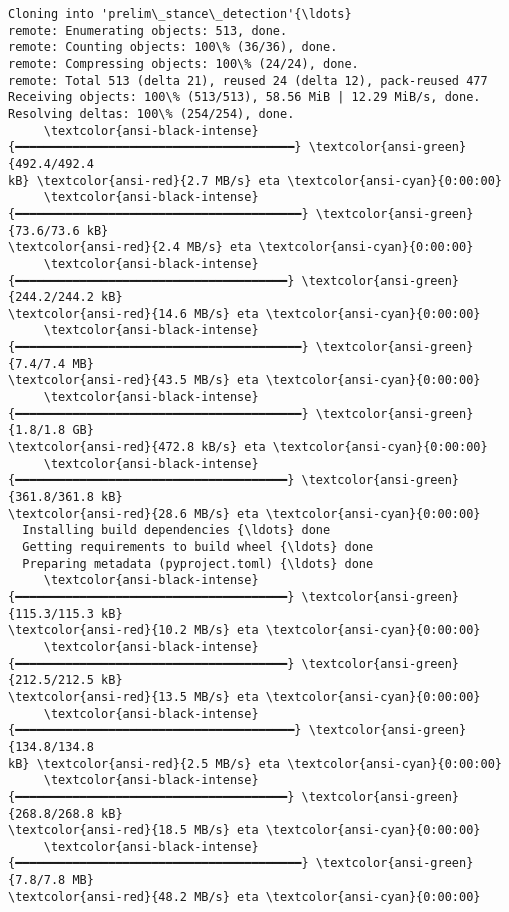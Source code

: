 \documentclass[11pt]{article}
\begin{document}
    \begin{Verbatim}[commandchars=\\\{\}]
Cloning into 'prelim\_stance\_detection'{\ldots}
remote: Enumerating objects: 513, done.
remote: Counting objects: 100\% (36/36), done.
remote: Compressing objects: 100\% (24/24), done.
remote: Total 513 (delta 21), reused 24 (delta 12), pack-reused 477
Receiving objects: 100\% (513/513), 58.56 MiB | 12.29 MiB/s, done.
Resolving deltas: 100\% (254/254), done.
     \textcolor{ansi-black-intense}{━━━━━━━━━━━━━━━━━━━━━━━━━━━━━━━━━━━━━━━} \textcolor{ansi-green}{492.4/492.4
kB} \textcolor{ansi-red}{2.7 MB/s} eta \textcolor{ansi-cyan}{0:00:00}
     \textcolor{ansi-black-intense}{━━━━━━━━━━━━━━━━━━━━━━━━━━━━━━━━━━━━━━━━} \textcolor{ansi-green}{73.6/73.6 kB}
\textcolor{ansi-red}{2.4 MB/s} eta \textcolor{ansi-cyan}{0:00:00}
     \textcolor{ansi-black-intense}{━━━━━━━━━━━━━━━━━━━━━━━━━━━━━━━━━━━━━━} \textcolor{ansi-green}{244.2/244.2 kB}
\textcolor{ansi-red}{14.6 MB/s} eta \textcolor{ansi-cyan}{0:00:00}
     \textcolor{ansi-black-intense}{━━━━━━━━━━━━━━━━━━━━━━━━━━━━━━━━━━━━━━━━} \textcolor{ansi-green}{7.4/7.4 MB}
\textcolor{ansi-red}{43.5 MB/s} eta \textcolor{ansi-cyan}{0:00:00}
     \textcolor{ansi-black-intense}{━━━━━━━━━━━━━━━━━━━━━━━━━━━━━━━━━━━━━━━━} \textcolor{ansi-green}{1.8/1.8 GB}
\textcolor{ansi-red}{472.8 kB/s} eta \textcolor{ansi-cyan}{0:00:00}
     \textcolor{ansi-black-intense}{━━━━━━━━━━━━━━━━━━━━━━━━━━━━━━━━━━━━━━} \textcolor{ansi-green}{361.8/361.8 kB}
\textcolor{ansi-red}{28.6 MB/s} eta \textcolor{ansi-cyan}{0:00:00}
  Installing build dependencies {\ldots} done
  Getting requirements to build wheel {\ldots} done
  Preparing metadata (pyproject.toml) {\ldots} done
     \textcolor{ansi-black-intense}{━━━━━━━━━━━━━━━━━━━━━━━━━━━━━━━━━━━━━━} \textcolor{ansi-green}{115.3/115.3 kB}
\textcolor{ansi-red}{10.2 MB/s} eta \textcolor{ansi-cyan}{0:00:00}
     \textcolor{ansi-black-intense}{━━━━━━━━━━━━━━━━━━━━━━━━━━━━━━━━━━━━━━} \textcolor{ansi-green}{212.5/212.5 kB}
\textcolor{ansi-red}{13.5 MB/s} eta \textcolor{ansi-cyan}{0:00:00}
     \textcolor{ansi-black-intense}{━━━━━━━━━━━━━━━━━━━━━━━━━━━━━━━━━━━━━━━} \textcolor{ansi-green}{134.8/134.8
kB} \textcolor{ansi-red}{2.5 MB/s} eta \textcolor{ansi-cyan}{0:00:00}
     \textcolor{ansi-black-intense}{━━━━━━━━━━━━━━━━━━━━━━━━━━━━━━━━━━━━━━} \textcolor{ansi-green}{268.8/268.8 kB}
\textcolor{ansi-red}{18.5 MB/s} eta \textcolor{ansi-cyan}{0:00:00}
     \textcolor{ansi-black-intense}{━━━━━━━━━━━━━━━━━━━━━━━━━━━━━━━━━━━━━━━━} \textcolor{ansi-green}{7.8/7.8 MB}
\textcolor{ansi-red}{48.2 MB/s} eta \textcolor{ansi-cyan}{0:00:00}

\end{Verbatim}
\end{document}
